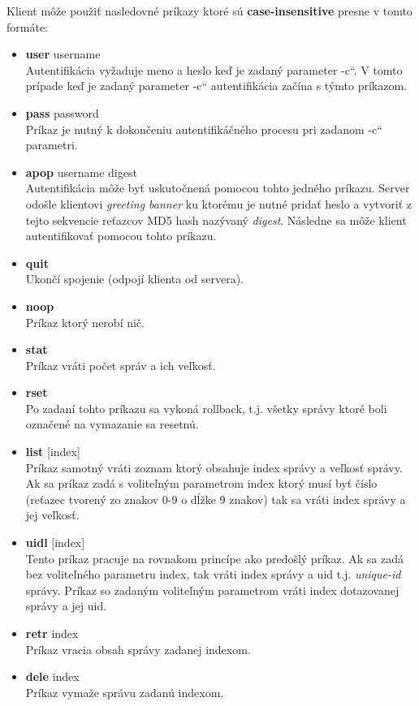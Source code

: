 \documentclass[11pt,a4paper]{article}
\providecommand{\uv}[1]{\quotedblbase #1\textquotedblleft}
\begin{document}
	Klient môže použiť nasledovné príkazy ktoré sú \textbf{case-insensitive} presne v tomto formáte:
	\begin{itemize}
		\item \textbf{user} username\\[0.1em]
			Autentifikácia vyžaduje meno a heslo keď je zadaný parameter \uv{-c}. V tomto prípade keď je zadaný parameter \uv{-c} autentifikácia začína s týmto príkazom.
		\item \textbf{pass} password\\[0.1em]
			Príkaz je nutný k dokončeniu autentifikáčného procesu pri zadanom \uv{-c} parametri.
		\item \textbf{apop} username digest\\[0.1em]
			Autentifikácia môže byť uskutočnená pomocou tohto jedného príkazu. Server odošle klientovi \textit{greeting banner} ku ktorému je nutné pridať heslo a vytvoriť z tejto sekvencie reťazcov MD5 hash nazývaný \textit{digest}. Následne sa môže klient autentifikovať pomocou tohto príkazu.
		\item \textbf{quit}\\[0.1em]
			Ukončí spojenie (odpojí klienta od servera).
		\item \textbf{noop}\\[0.1em]
			Príkaz ktorý nerobí nič.
		\item \textbf{stat}\\[0.1em]
			Príkaz vráti počet správ a ich veľkosť.
		\item \textbf{rset}\\[0.1em]
			Po zadaní tohto príkazu sa vykoná rollback, t.j. všetky správy ktoré boli označené na vymazanie sa resetnú.
		\item \textbf{list} [index]\\[0.1em]
			Príkaz samotný vráti zoznam ktorý obsahuje index správy a veľkosť správy. Ak sa príkaz zadá s voliteľným parametrom index ktorý musí byť číslo (reťazec tvorený zo znakov 0-9 o dĺžke 9 znakov) tak sa vráti index správy a jej veľkosť.
		\item \textbf{uidl} [index]\\[0.1em]
			Tento príkaz pracuje na rovnakom princípe ako predošlý príkaz. Ak sa zadá bez voliteľného parametru index, tak vráti index správy a uid t.j. \textit{unique-id} správy. Príkaz so zadaným voliteľným parametrom vráti index dotazovanej správy a jej uid.
		\item \textbf{retr} index\\[0.1em]
			Príkaz vracia obsah správy zadanej indexom.
		\item \textbf{dele} index\\[0.1em]
			Príkaz vymaže správu zadanú indexom.
	\end{itemize}
\end{document}
